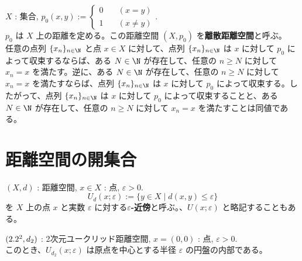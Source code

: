 \documentclass[article,paper=a4paper]{jlreq}
\begin{document}
\begin{ex}
    $X$ : 集合, $p_{0}(x,y) := \begin{cases}
        0 \quad & (x=y) \\
        1 \quad & (x \neq y)
    \end{cases}$.\\
    $p_{0}$ は $X$ 上の距離を定める。この距離空間 $(X, p_0)$ を\textbf{離散距離空間}と呼ぶ。\\
    \quad 任意の点列 $\{x_n\}_{n \in \N}$ と点 $x \in X$ に対して、点列 $\{x_n\}_{n \in \N}$ は $x$ に対して $p_0$ によって収束するならば、ある $N \in \N$ が存在して、任意の $n \geq N$ に対して $x_n = x$ を満たす。逆に、ある $N \in \N$ が存在して、任意の $n \geq N$ に対して $x_n = x$ を満たすならば、点列 $\{x_n\}_{n \in \N}$ は $x$ に対して $p_0$ によって収束する。したがって、点列 $\{x_n\}_{n \in \N}$ は $x$ に対して $p_0$ によって収束することと、ある $N \in \N$ が存在して、任意の $n \geq N$ に対して $x_n = x$ を満たすことは同値である。
\end{ex}

\section{距離空間の開集合}

\begin{dfn}
    \quad $(X,d)$ : 距離空間, $x \in X$ : 点, $\varepsilon > 0$.\\
    \[U_d(x;\varepsilon) := \{y \in X \mid d(x,y) \leq  \varepsilon\}\]
    を $X$ 上の点 $x$ と実数 $\varepsilon$ に対する$\varepsilon$\textbf{-\hspace{0pt}近傍}と呼ぶ。、$U(x;\varepsilon)$ と略記することもある。
\end{dfn}

\begin{ex}
    \quad $(2.2^2, d_2)$ : 2次元ユークリッド距離空間, $x = (0,0)$ : 点, $\varepsilon > 0$.\\
    このとき、$U_{d_2}(x;\varepsilon)$ は原点を中心とする半径 $\varepsilon$ の円盤の内部である。
\end{ex}
\end{document}
